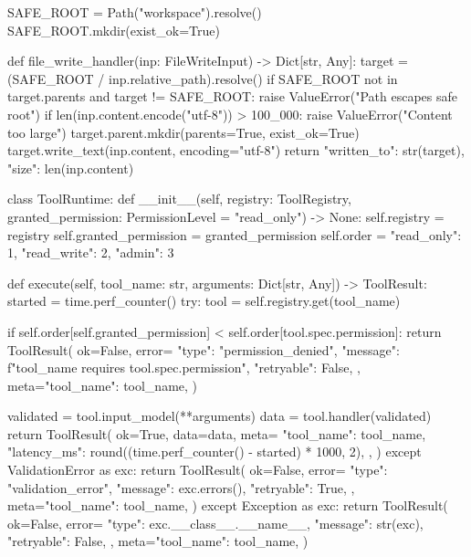 \begin{codeblock}
SAFE_ROOT = Path("workspace").resolve()
SAFE_ROOT.mkdir(exist_ok=True)


def file_write_handler(inp: FileWriteInput) -> Dict[str, Any]:
    target = (SAFE_ROOT / inp.relative_path).resolve()
    if SAFE_ROOT not in target.parents and target != SAFE_ROOT:
        raise ValueError("Path escapes safe root")
    if len(inp.content.encode("utf-8")) > 100_000:
        raise ValueError("Content too large")
    target.parent.mkdir(parents=True, exist_ok=True)
    target.write_text(inp.content, encoding="utf-8")
    return {"written_to": str(target), "size": len(inp.content)}


class ToolRuntime:
    def __init__(self, registry: ToolRegistry, granted_permission: PermissionLevel = "read_only") -> None:
        self.registry = registry
        self.granted_permission = granted_permission
        self.order = {"read_only": 1, "read_write": 2, "admin": 3}

    def execute(self, tool_name: str, arguments: Dict[str, Any]) -> ToolResult:
        started = time.perf_counter()
        try:
            tool = self.registry.get(tool_name)

            if self.order[self.granted_permission] < self.order[tool.spec.permission]:
                return ToolResult(
                    ok=False,
                    error={
                        "type": "permission_denied",
                        "message": f"{tool_name} requires {tool.spec.permission}",
                        "retryable": False,
                    },
                    meta={"tool_name": tool_name},
                )

            validated = tool.input_model(**arguments)
            data = tool.handler(validated)
            return ToolResult(
                ok=True,
                data=data,
                meta={
                    "tool_name": tool_name,
                    "latency_ms": round((time.perf_counter() - started) * 1000, 2),
                },
            )
        except ValidationError as exc:
            return ToolResult(
                ok=False,
                error={
                    "type": "validation_error",
                    "message": exc.errors(),
                    "retryable": True,
                },
                meta={"tool_name": tool_name},
            )
        except Exception as exc:
            return ToolResult(
                ok=False,
                error={
                    "type": exc.__class__.__name__,
                    "message": str(exc),
                    "retryable": False,
                },
                meta={"tool_name": tool_name},
            )



\end{codeblock}
